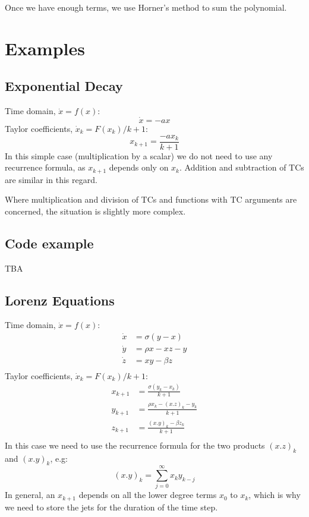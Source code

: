 \documentclass[11pt]{article}
\begin{document}
Once we have enough terms, we use Horner's method to sum the polynomial.
\section{Examples}
\subsection{Exponential Decay}
Time domain, $\dot{x} = f(x)$:
\begin{equation}
\dot{x} = - a x
\end{equation}
Taylor coefficients, $\dot{x}_k = F(x_k) / k + 1$:
\begin{equation}
x_{k+1} = \frac{- a x_k} {k + 1}
\end{equation}
In this simple case (multiplication by a scalar) we do not need to use any recurrence formula, as $x_{k+1}$ depends only on $x_k$.
Addition and subtraction of TCs are similar in this regard.

Where multiplication and division of TCs and functions with TC arguments are concerned, the situation is slightly more complex.
\subsection{Code example}
TBA
\subsection{Lorenz Equations}
Time domain, $\dot{x} = f(x)$:
\begin{equation}
\begin{aligned}
\dot{x} &= \sigma (y - x) \\
\dot{y} &= \rho x - xz - y \\
\dot{z} &= xy - \beta z \\
\end{aligned}
\end{equation}
Taylor coefficients, $\dot{x}_k = F(x_k) / k + 1$:
\begin{equation}
\begin{aligned}
x_{k+1} &= \frac{\sigma (y_k - x_k)}{k + 1} \\
y_{k+1} &= \frac{\rho x_k - (x.z)_k - y_k}{k + 1} \\
z_{k+1} &= \frac{(x.y)_k - \beta z_k}{k + 1} \\
\end{aligned}
\end{equation}
In this case we need to use the recurrence formula for the two products $(x.z)_k$ and $(x.y)_k$, e.g:
\begin{equation}
(x.y)_k = \sum_{j=0}^{\infty} x_k y_{k - j}
\end{equation}
In general, an $x_{k+1}$ depends on all the lower degree terms $x_0$ to $x_k$, which is why we need to store the jets for the duration of the time step.
\end{document}
